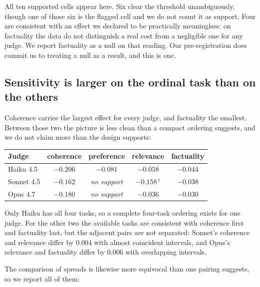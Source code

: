 
All ten supported cells appear here. Six clear the threshold unambiguously,
though one of those six is the flagged cell and we do not count it as support.
Four are consistent with an effect we declared to be practically meaningless: on
factuality the data do not distinguish a real cost from a negligible one for any
judge. We report factuality as a null on that reading. Our pre-registration does
commit us to treating a null as a result, and this is one.

\subsection{Sensitivity is larger on the ordinal task than on the others}

Coherence carries the largest effect for every judge, and factuality the
smallest. Between those two the picture is less clean than a compact ordering
suggests, and we do not claim more than the design supports:

\begin{center}
\begin{tabular}{lcccc}
\toprule
Judge & coherence & preference & relevance & factuality \\
\midrule
Haiku 4.5   & $-0.206$ & $-0.081$          & $-0.058$          & $-0.044$ \\
Sonnet 4.5  & $-0.162$ & \emph{no support} & $-0.158$\,$^{\dagger}$ & $-0.038$ \\
Opus 4.7    & $-0.180$ & \emph{no support} & $-0.036$          & $-0.030$ \\
\bottomrule
\end{tabular}
\end{center}


Only Haiku has all four tasks, so a complete four-task ordering exists for one
judge. For the other two the available tasks are consistent with coherence
first and factuality last, but the adjacent pairs are not separated: Sonnet's
coherence and relevance differ by $0.004$ with almost coincident intervals, and
Opus's relevance and factuality differ by $0.006$ with overlapping intervals.

The comparison of spreads is likewise more equivocal than one pairing suggests,
so we report all of them:

